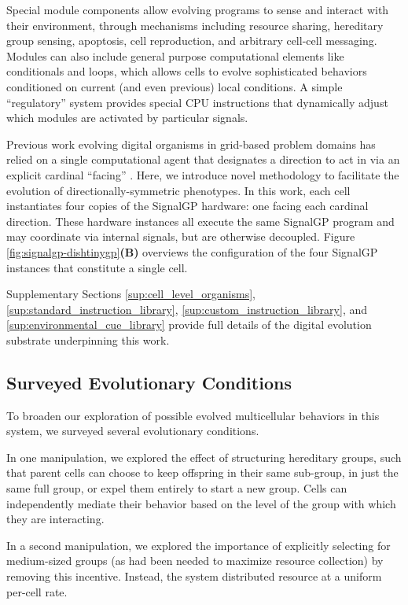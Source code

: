 Special module components allow evolving programs to sense and interact with their environment, through mechanisms including resource sharing, hereditary group sensing, apoptosis, cell reproduction, and arbitrary cell-cell messaging.
Modules can also include general purpose computational elements like conditionals and loops, which allows cells to evolve sophisticated behaviors conditioned on current (and even previous) local conditions.
A simple ``regulatory'' system provides special CPU instructions that dynamically adjust which modules are activated by particular signals.

Previous work evolving digital organisms in grid-based problem domains has relied on a single computational agent that designates a direction to act in via an explicit cardinal ``facing'' \citep{goldsby2014evolutionary, goldsby2018serendipitous, grabowski2010early, biswas2014causes, lalejini2018evolving}.
Here, we introduce novel methodology to facilitate the evolution of directionally-symmetric phenotypes.
In this work, each cell instantiates four copies of the SignalGP hardware: one facing each cardinal direction.
These hardware instances all execute the same SignalGP program and may coordinate via internal signals, but are otherwise decoupled.
Figure \ref{fig:signalgp-dishtinygp}\textbf{(B)} overviews the configuration of the four SignalGP instances that constitute a single cell.

Supplementary Sections \ref{sup:cell_level_organisms}, \ref{sup:standard_instruction_library}, \ref{sup:custom_instruction_library}, and \ref{sup:environmental_cue_library} provide full details of the digital evolution substrate underpinning this work.

\subsection{Surveyed Evolutionary Conditions}

To broaden our exploration of possible evolved multicellular behaviors in this system, we surveyed several evolutionary conditions.

In one manipulation, we explored the effect of structuring hereditary groups, such that parent cells can choose to keep offspring in their same sub-group, in just the same full group, or expel them entirely to start a new group.
Cells can independently mediate their behavior based on the level of the group with which they are interacting.

In a second manipulation, we explored the importance of explicitly selecting for medium-sized groups (as had been needed to maximize resource collection) by removing this incentive.
Instead, the system distributed resource at a uniform per-cell rate.

